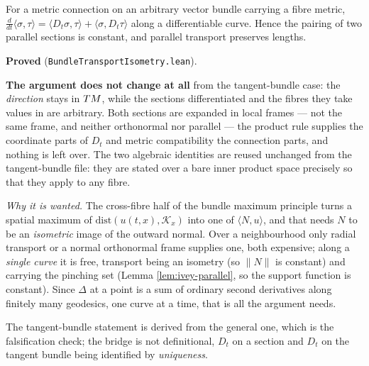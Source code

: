 \begin{lemma}
  \label{lem:bundle-transport-leibniz}
  \leanok
  For a metric connection on an arbitrary vector bundle carrying a fibre metric,
  $\frac{d}{dt}\langle \sigma,\tau\rangle
   = \langle D_t\sigma,\tau\rangle + \langle \sigma,D_t\tau\rangle$
  along a differentiable curve. Hence the pairing of two parallel sections is constant, and
  parallel transport preserves lengths.

  \textbf{Proved} (\texttt{BundleTransportIsometry.lean}).

  \textbf{The argument does not change at all} from the tangent-bundle case: the
  \emph{direction} stays in $TM$, while the sections differentiated and the fibres they take
  values in are arbitrary. Both sections are expanded in local frames --- not the same frame,
  and neither orthonormal nor parallel --- the product rule supplies the coordinate parts of
  $D_t$ and metric compatibility the connection parts, and nothing is left over. The two
  algebraic identities are reused unchanged from the tangent-bundle file: they are stated over
  a bare inner product space precisely so that they apply to any fibre.

  \emph{Why it is wanted.} The cross-fibre half of the bundle maximum principle turns a
  spatial maximum of $\mathrm{dist}(u(t,x),\mathcal{K}_x)$ into one of $\langle N,u\rangle$,
  and that needs $N$ to be an \emph{isometric} image of the outward normal. Over a
  neighbourhood only radial transport or a normal orthonormal frame supplies one, both
  expensive; along a \emph{single curve} it is free, transport being an isometry (so $\|N\|$
  is constant) and carrying the pinching set (Lemma \ref{lem:ivey-parallel}, so the support
  function is constant). Since $\Delta$ at a point is a sum of ordinary second derivatives
  along finitely many geodesics, one curve at a time, that is all the argument needs.

  The tangent-bundle statement is derived from the general one, which is the falsification
  check; the bridge is not definitional, $D_t$ on a section and $D_t$ on the tangent bundle
  being identified by \emph{uniqueness}.
\end{lemma}

